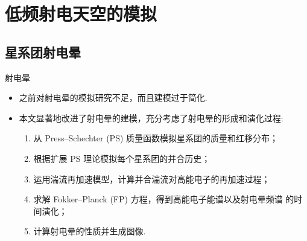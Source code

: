 \documentclass{beamer}
\begin{document}
\section{低频射电天空的模拟}

\subsection{星系团射电晕}

\begin{frame}{射电晕}
  \begin{itemize}
  \item 之前对射电晕的模拟研究不足，而且建模过于简化.
  \item 本文显著地改进了射电晕的建模，充分考虑了射电晕的形成和演化过程:
    \begin{enumerate}
      \item 从 Press--Schechter (PS) 质量函数模拟星系团的质量和红移分布；
      \item 根据扩展 PS 理论模拟每个星系团的并合历史；
      \item 运用湍流再加速模型，计算并合湍流对高能电子的再加速过程；
      \item 求解 Fokker--Planck (FP) 方程，得到高能电子能谱以及射电晕频谱
        的时间演化；
      \item 计算射电晕的性质并生成图像.
    \end{enumerate}
  \end{itemize}
\end{frame}
\end{document}
